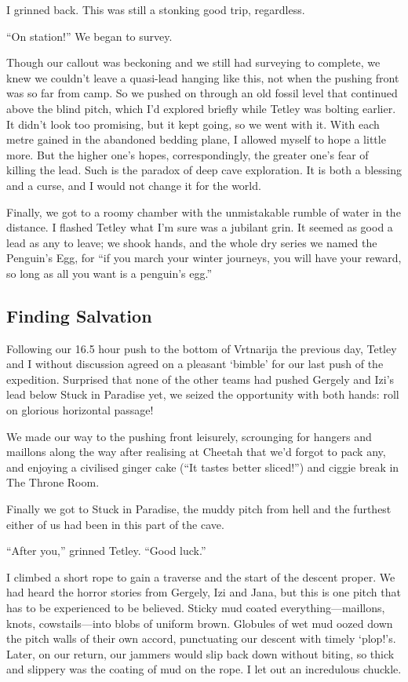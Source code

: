 I grinned back. This was still a stonking good trip, regardless.

``On station!'' We began to survey.

Though our callout was beckoning and we still had surveying to complete,
we knew we couldn't leave a quasi-lead hanging like this, not when the
pushing front was so far from camp. So we pushed on through an old
fossil level that continued above the blind pitch, which I'd explored
briefly while Tetley was bolting earlier. It didn't look too promising,
but it kept going, so we went with it. With each metre gained in the
abandoned bedding plane, I allowed myself to hope a little more. But the
higher one's hopes, correspondingly, the greater one's fear of killing
the lead. Such is the paradox of deep cave exploration. It is both a
blessing and a curse, and I would not change it for the world.

Finally, we got to a roomy chamber with the unmistakable rumble of water
in the distance. I flashed Tetley what I'm sure was a jubilant grin. It
seemed as good a lead as any to leave; we shook hands, and the whole dry
series we named the Penguin's Egg, for ``if you march your winter
journeys, you will have your reward, so long as all you want is a
penguin's egg.''


\subsection{Finding Salvation}

Following our 16.5 hour push to the bottom of Vrtnarija the previous
day, Tetley and I without discussion agreed on a pleasant `bimble' for
our last push of the expedition. Surprised that none of the other teams
had pushed Gergely and Izi's lead below Stuck in Paradise yet, we seized
the opportunity with both hands: roll on glorious horizontal passage!

We made our way to the pushing front leisurely, scrounging for hangers
and maillons along the way after realising at Cheetah that we'd forgot
to pack any, and enjoying a civilised ginger cake (``It tastes better
sliced!'') and ciggie break in The Throne Room.

Finally we got to Stuck in Paradise, the muddy pitch from hell and the
furthest either of us had been in this part of the cave.

``After you,'' grinned Tetley. ``Good luck.''

I climbed a short rope to gain a traverse and the start of the descent
proper. We had heard the horror stories from Gergely, Izi and Jana, but
this is one pitch that has to be experienced to be believed. Sticky mud
coated everything---maillons, knots, cowstails---into blobs of uniform
brown. Globules of wet mud oozed down the pitch walls of their own
accord, punctuating our descent with timely `plop!'s. Later, on our
return, our jammers would slip back down without biting, so thick and
slippery was the coating of mud on the rope. I let out an incredulous
chuckle.

